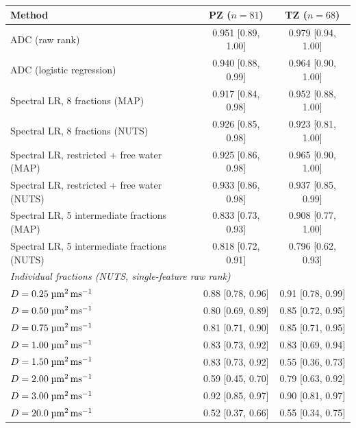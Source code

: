 
\begin{table}[p]
\centering
\caption{}  %
\label{tab:auc}
\smallskip
\begin{tabular}{lcc}
\toprule
Method & PZ ($n=81$) & TZ ($n=68$) \\
\midrule
ADC (raw rank)            & 0.951 [0.89, 1.00] & 0.979 [0.94, 1.00] \\
ADC (logistic regression) & 0.940 [0.88, 0.99] & 0.964 [0.90, 1.00] \\
\midrule
Spectral LR, 8 fractions (MAP)        & 0.917 [0.84, 0.98] & 0.952 [0.88, 1.00] \\
Spectral LR, 8 fractions (NUTS)       & 0.926 [0.85, 0.98] & 0.923 [0.81, 1.00] \\
\midrule
Spectral LR, restricted + free water (MAP)  & 0.925 [0.86, 0.98] & 0.965 [0.90, 1.00] \\
Spectral LR, restricted + free water (NUTS) & 0.933 [0.86, 0.98] & 0.937 [0.85, 0.99] \\
\midrule
Spectral LR, 5 intermediate fractions (MAP)  & 0.833 [0.73, 0.93] & 0.908 [0.77, 1.00] \\
Spectral LR, 5 intermediate fractions (NUTS) & 0.818 [0.72, 0.91] & 0.796 [0.62, 0.93] \\
\midrule
\multicolumn{3}{l}{\textit{Individual fractions (NUTS, single-feature raw rank)}} \\
$D = 0.25\;\si{\micro\meter\squared\per\milli\second}$  & 0.88 [0.78, 0.96] & 0.91 [0.78, 0.99] \\
$D = 0.50\;\si{\micro\meter\squared\per\milli\second}$  & 0.80 [0.69, 0.89] & 0.85 [0.72, 0.95] \\
$D = 0.75\;\si{\micro\meter\squared\per\milli\second}$  & 0.81 [0.71, 0.90] & 0.85 [0.71, 0.95] \\
$D = 1.00\;\si{\micro\meter\squared\per\milli\second}$  & 0.83 [0.73, 0.92] & 0.83 [0.69, 0.94] \\
$D = 1.50\;\si{\micro\meter\squared\per\milli\second}$  & 0.83 [0.73, 0.92] & 0.55 [0.36, 0.73] \\
$D = 2.00\;\si{\micro\meter\squared\per\milli\second}$  & 0.59 [0.45, 0.70] & 0.79 [0.63, 0.92] \\
$D = 3.00\;\si{\micro\meter\squared\per\milli\second}$  & 0.92 [0.85, 0.97] & 0.90 [0.81, 0.97] \\
$D = 20.0\;\si{\micro\meter\squared\per\milli\second}$  & 0.52 [0.37, 0.66] & 0.55 [0.34, 0.75] \\
\bottomrule
\end{tabular}


\end{table}
